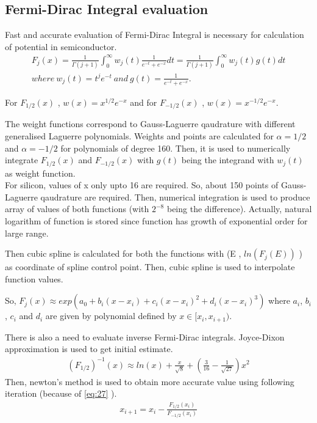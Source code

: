 \subsection{Fermi-Dirac Integral evaluation}
Fast and accurate evaluation of Fermi-Dirac Integral is necessary for calculation of potential in semiconductor. 
\begin{align*}
F_j(x) =  \frac{1}{\Gamma(j+1)} \int^\infty_0 w_j(t)\frac{1}{e^{-t}+e^{-x}} dt = \frac{1}{\Gamma(j+1)} \int^\infty_0 w_j(t)g(t) dt \\
where\ w_j(t) = t^j e^{-t}\ and\  g(t) = \frac{1}{e^{-t}+e^{-x}}.
\end{align*}

For $F_{1/2}(x)$ , $ w(x) = x^{1/2} e^{-x} $ and for $F_{-1/2}(x)$ , $ w(x) = x^{-1/2} e^{-x} $.

The weight functions correspond to Gauss-Laguerre qaudrature with different generalised Laguerre polynomials. Weights and points are calculated for $\alpha=1/2$ and $\alpha=-1/2$ for polynomials of degree 160. 
Then, it is used to numerically integrate $F_{1/2}(x)$ and $F_{-1/2}(x)$ with $g(t)$ being the integrand with $w_j(t)$ as weight function.\\
For silicon, values of x only upto 16 are required. So, about 150 points of Gauss-Laguerre qaudrature are required. Then, numerical integration is used to produce array of values of both functions (with $2^{-8}$ being the difference). Actually, natural logarithm of function is stored since function has growth of exponential order for large range. 

Then cubic spline is calculated for both the functions with (E , $ln(F_j(E))$ ) as coordinate of spline control point. Then, cubic spline is used to interpolate function values.

So, $F_j(x) \approx exp(a_0 + b_i(x-x_i) + c_i(x-x_i)^2 + d_i(x-x_i)^3 )$ where $a_i$, $b_i$, $c_i$ and $d_i$ are given by polynomial defined by $x \in [x_i,x_{i+1}) $. 

There is also a need to evaluate inverse Fermi-Dirac integrals. Joyce-Dixon approximation\cite{bart} is used to get initial estimate. 
\begin{align*}
(F_{1/2})^{-1}(x) \approx ln(x) + \frac{x}{\sqrt{8}} + \left(\frac{3}{16} - \frac{1}{\sqrt{27}}\right) x^2
\end{align*}
Then, newton's method is used to obtain more accurate value using following iteration (because of \eqref{eq:27} ).
\begin{align*}
x_{i+1} = x_i - \frac{F_{1/2}(x_i)}{F_{-1/2}(x_i)}
\end{align*}

